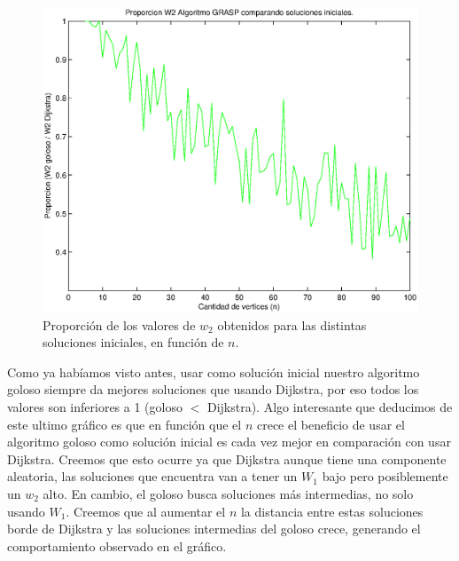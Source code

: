 \begin{figure}[H]
  \begin{center}
    \begin{minipage}{0.7\linewidth}
      \includegraphics[width=\linewidth]{graficos/grasp_comparacion_soluciones_iniciales_tiempo.eps}
      \caption{Proporción de los valores de $w_2$ obtenidos para las distintas soluciones iniciales, en función de $n$.}\label{fig:grasp-soluciones-iniciales-tiempo}
    \end{minipage}
  \end{center}
\end{figure}


Como ya habíamos visto antes, usar como solución inicial nuestro algoritmo goloso siempre da mejores soluciones que usando Dijkstra, por eso todos los valores son inferiores a 1 (goloso $<$ Dijkstra). Algo interesante que deducimos de este ultimo gráfico es que en función que el $n$ crece el beneficio de usar el algoritmo goloso como solución inicial es cada vez mejor en comparación con usar Dijkstra. Creemos que esto ocurre ya que Dijkstra aunque tiene una componente aleatoria, las soluciones que encuentra van a tener un $W_1$ bajo pero posiblemente un $w_2$ alto. En cambio, el goloso busca soluciones más intermedias, no solo usando $W_1$. Creemos que al aumentar el $n$ la distancia entre estas soluciones borde de Dijkstra y las soluciones intermedias del goloso crece, generando el comportamiento observado en el gráfico. 